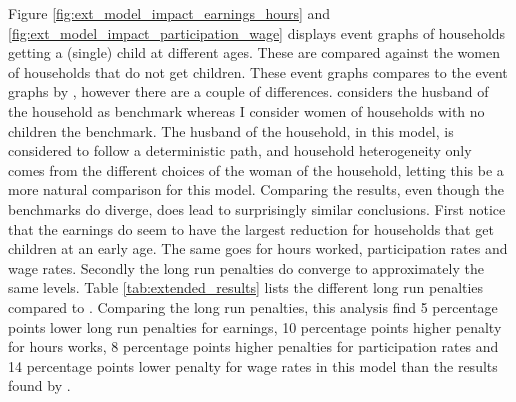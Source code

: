 Figure \ref{fig:ext_model_impact_earnings_hours} and \ref{fig:ext_model_impact_participation_wage} displays event graphs of households getting a (single) child at different ages. These are compared against the women of households that do not get children. These event graphs compares to the event graphs by \textcite{kleven_children_2019}, however there are a couple of differences. \textcite{kleven_children_2019} considers the husband of the household as benchmark whereas I consider women of households with no children the benchmark. The husband of the household, in this model, is considered to follow a deterministic path, and household heterogeneity only comes from the different choices of the woman of the household, letting this be a more natural comparison for this model. Comparing the results, even though the benchmarks do diverge, does lead to surprisingly similar conclusions. First notice that the earnings do seem to have the largest reduction for households that get children at an early age. The same goes for hours worked, participation rates and wage rates. Secondly the long run penalties do converge to approximately the same levels. Table \ref{tab:extended_results} lists the different long run penalties compared to \textcite{kleven_children_2019}. Comparing the long run penalties, this analysis find 5 percentage points lower long run penalties for earnings, 10 percentage points higher penalty for hours works, 8 percentage points higher penalties for participation rates and 14 percentage points lower penalty for wage rates in this model than the results found by \textcite{kleven_children_2019}.

